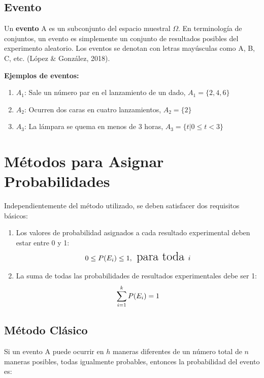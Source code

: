 \documentclass[
  spanish,
  letterpaper,
]{book}
\begin{document}
\subsection{Evento}\label{evento}

Un \textbf{evento} A es un subconjunto del espacio muestral \(\Omega\).
En terminología de conjuntos, un evento es simplemente un conjunto de
resultados posibles del experimento aleatorio. Los eventos se denotan
con letras mayúsculas como A, B, C, etc. (López \& González, 2018).

\textbf{Ejemplos de eventos:}

\begin{enumerate}
\def\labelenumi{\arabic{enumi}.}
\item
  \(A_1\)\hspace{0pt}: Sale un número par en el lanzamiento de un dado,
  \(A_1 = \{2, 4, 6\}\)
\item
  \(A_2\)\hspace{0pt}: Ocurren dos caras en cuatro lanzamientos,
  \(A_2 = \{2\}\)
\item
  \(A_3\)\hspace{0pt}: La lámpara se quema en menos de 3 horas,
  \(A_3 = \{t | 0 \leq t < 3\}\)
\end{enumerate}

\section{Métodos para Asignar
Probabilidades}\label{muxe9todos-para-asignar-probabilidades}

Independientemente del método utilizado, se deben satisfacer dos
requisitos básicos:

\begin{enumerate}
\def\labelenumi{\arabic{enumi}.}
\item
  Los valores de probabilidad asignados a cada resultado experimental
  deben estar entre 0 y 1:
  \[\LARGE 0 \leq P(E_i) \leq 1, \text{ para toda } i\]
\item
  La suma de todas las probabilidades de resultados experimentales debe
  ser 1: \[\LARGE \sum_{i=1}^{k} P(E_i) = 1\]
\end{enumerate}

\subsection{Método Clásico}\label{muxe9todo-cluxe1sico}

Si un evento A puede ocurrir en \(h\) maneras diferentes de un número
total de \(n\) maneras posibles, todas igualmente probables, entonces la
probabilidad del evento es:
\end{document}
